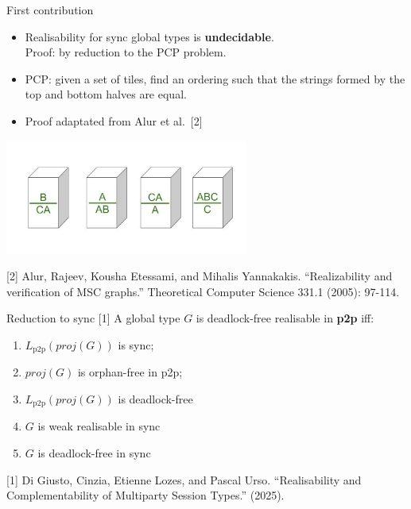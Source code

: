 \documentclass{beamer}
\begin{document}
\begin{frame}[fragile]{First contribution}

	\vspace{1em}

	\begin{itemize}
		\item Realisability for sync global types is
    \textbf{undecidable}. \\ Proof: by reduction to the PCP problem.
    \item PCP: given a set of tiles, find an ordering such that the
    strings formed by the top and bottom halves are equal.
    \item Proof adaptated from Alur et al.~[2]
	\end{itemize}

	\begin{center}
		\includegraphics[width=0.6\textwidth]{../img/pcp.jpg}
	\end{center}

	\small{[2] Alur, Rajeev, Kousha Etessami, and Mihalis Yannakakis. ``Realizability and verification of MSC graphs.'' Theoretical Computer Science 331.1 (2005): 97-114.}
\end{frame}

\begin{frame}{Reduction to sync [1]}
	\vspace{1.5cm}
	A global type $G$ is deadlock-free realisable in \textbf{p2p} iff:
	\begin{enumerate}
		\item $L_{\text{p2p}}(proj(G))$ is sync;
		\item $proj(G)$ is orphan-free in p2p; %
		\item $L_{\text{p2p}}(proj(G))$ is deadlock-free
		\item $G$ is weak realisable in sync
		\item $G$ is deadlock-free in sync \hspace{4mm} \scalebox{1.5}{{\color{red}$\longleftarrow$}}
	\end{enumerate}
	
	\vspace{1.5cm}

	\small{[1] Di Giusto, Cinzia, Etienne Lozes, and Pascal Urso. ``Realisability and Complementability of Multiparty Session Types.'' (2025).}
\end{frame}
\end{document}
